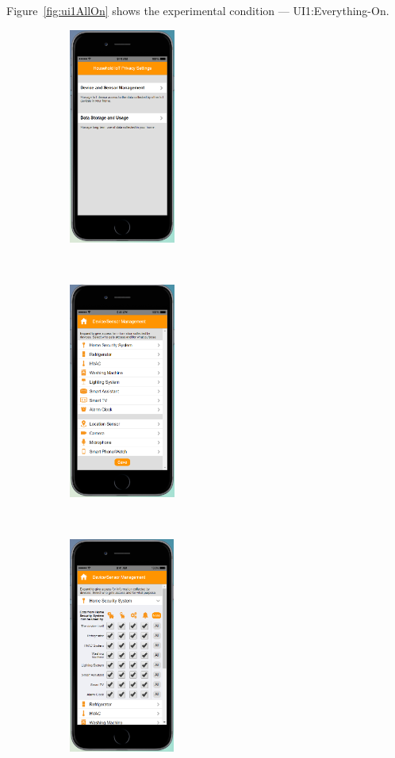 \begin{appendices}
Figure~\ref{fig:ui1AllOn} shows the experimental condition --- UI1:Everything-On.
\begin{figure}
	\centering
	\begin{subfigure}[t]{0.24\textwidth}
		\centering
		\includegraphics[height=2.8in]{figures/ui1allOff1.png}
	\end{subfigure}%
	~
	\begin{subfigure}[t]{0.24\textwidth}
		\centering
		\includegraphics[height=2.8in]{figures/ui1allOff2.png}
	\end{subfigure}%
	~
	\begin{subfigure}[t]{0.24\textwidth}
		\centering
		\includegraphics[height=2.8in]{figures/ui2allOn3.png}

\end{subfigure}
\end{figure}
\end{appendices}
